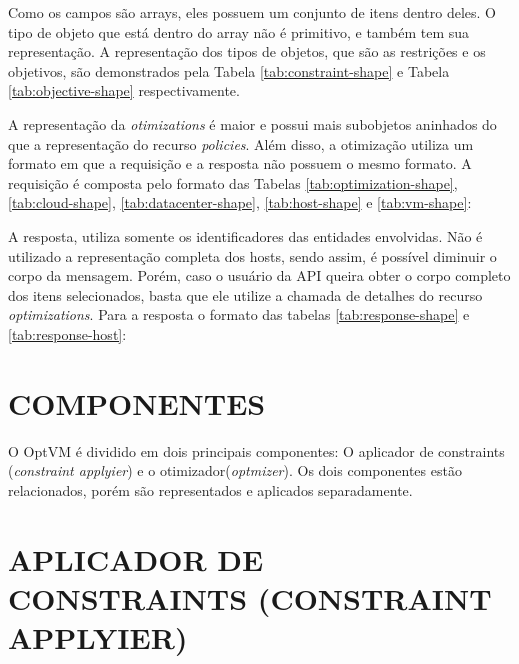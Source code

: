 

Como os campos são arrays, eles possuem um conjunto de itens dentro deles. O tipo
de objeto que está dentro do array não é primitivo, e também tem sua representação.
A representação dos tipos de objetos, que são as restrições e os objetivos, são demonstrados
pela Tabela \ref{tab:constraint-shape} e Tabela \ref{tab:objective-shape} respectivamente.




A representação da \textit{otimizations} é maior e possui mais subobjetos aninhados
do que a representação do recurso \textit{policies}. Além disso, a otimização utiliza 
um formato em que a requisição e a resposta não possuem o mesmo formato. A requisição
é composta pelo formato das Tabelas \ref{tab:optimization-shape}, \ref{tab:cloud-shape},
\ref{tab:datacenter-shape}, \ref{tab:host-shape} e \ref{tab:vm-shape}:







A resposta, utiliza somente os identificadores das entidades envolvidas. Não
é utilizado a representação completa dos hosts, sendo assim, é possível
diminuir o corpo da mensagem. Porém, caso o usuário da API queira obter 
o corpo completo dos itens selecionados, basta que ele utilize a chamada de 
detalhes do recurso \textit{optimizations}. Para a resposta o formato das
tabelas \ref{tab:response-shape} e \ref{tab:response-host}:




\section{COMPONENTES}
O OptVM é dividido em dois principais componentes: O aplicador de constraints (\textit{constraint applyier})
e o otimizador(\textit{optmizer}). Os dois componentes estão relacionados, porém são representados e 
aplicados separadamente. 

\section{APLICADOR DE CONSTRAINTS (CONSTRAINT APPLYIER)}

